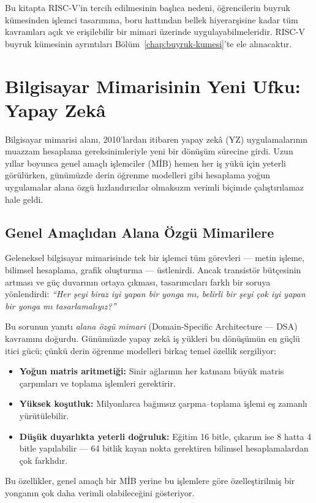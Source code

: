 Bu kitapta RISC-V'in tercih edilmesinin başlıca nedeni, öğrencilerin buyruk kümesinden işlemci tasarımına, boru hattından bellek hiyerarşisine kadar tüm kavramları açık ve erişilebilir bir mimari üzerinde uygulayabilmeleridir. RISC-V buyruk kümesinin ayrıntıları Bölüm~\ref{chap:buyruk-kumesi}'te ele alınacaktır.


\section{Bilgisayar Mimarisinin Yeni Ufku: Yapay Zekâ}
\label{sec:yapay-zeka-ufku}

Bilgisayar mimarisi alanı, 2010'lardan itibaren yapay zekâ (YZ) uygulamalarının muazzam hesaplama gereksinimleriyle yeni bir dönüşüm sürecine girdi. Uzun yıllar boyunca genel amaçlı işlemciler (MİB) hemen her iş yükü için yeterli görülürken, günümüzde derin öğrenme modelleri gibi hesaplama yoğun uygulamalar alana özgü hızlandırıcılar olmaksızın verimli biçimde çalıştırılamaz hale geldi.


\subsection{Genel Amaçlıdan Alana Özgü Mimarilere}
\label{sec:genel-alana-ozgu}

Geleneksel bilgisayar mimarisinde tek bir işlemci tüm görevleri --- metin işleme, bilimsel hesaplama, grafik oluşturma --- üstlenirdi. Ancak transistör bütçesinin artması ve güç duvarının ortaya çıkması, tasarımcıları farklı bir soruya yönlendirdi: \emph{``Her şeyi biraz iyi yapan bir yonga mı, belirli bir şeyi çok iyi yapan bir yonga mı tasarlamalıyız?''}

Bu sorunun yanıtı \emph{alana özgü mimari} (Domain-Specific Architecture --- DSA) kavramını doğurdu. Günümüzde yapay zekâ iş yükleri bu dönüşümün en güçlü itici gücü; çünkü derin öğrenme modelleri birkaç temel özellik sergiliyor:
\begin{itemize}
    \item \textbf{Yoğun matris aritmetiği:} Sinir ağlarının her katmanı büyük matris çarpımları ve toplama işlemleri gerektirir.
    \item \textbf{Yüksek koşutluk:} Milyonlarca bağımsız çarpma--toplama işlemi eş zamanlı yürütülebilir.
    \item \textbf{Düşük duyarlıkta yeterli doğruluk:} Eğitim 16 bitle, çıkarım ise 8 hatta 4 bitle yapılabilir --- 64 bitlik kayan nokta gerektiren bilimsel hesaplamalardan çok farklıdır.
\end{itemize}
Bu özellikler, genel amaçlı bir MİB yerine bu işlemlere göre özelleştirilmiş bir yonganın çok daha verimli olabileceğini gösteriyor.


